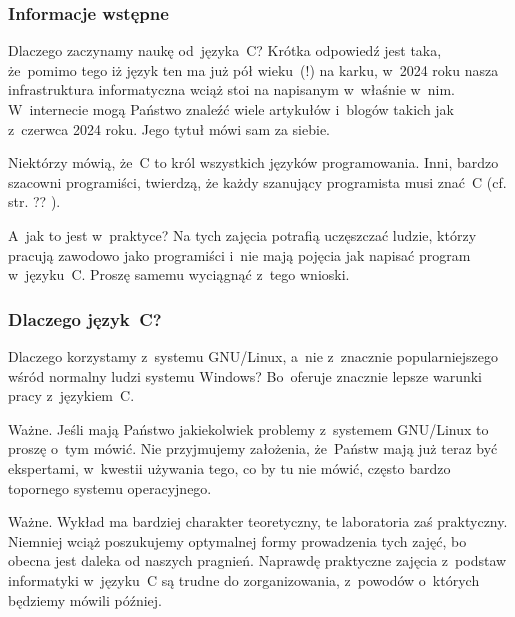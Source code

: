 \documentclass[10pt,t]{beamer}
\begin{document}
\begin{frame}
  \frametitle{Informacje wstępne}


  Dlaczego zaczynamy naukę od~języka~C? Krótka odpowiedź jest taka,
  że~pomimo tego iż język ten ma już pół wieku~(!) na karku, w~2024 roku
  nasza infrastruktura informatyczna wciąż stoi na napisanym w~właśnie
  w~nim. W~internecie mogą Państwo znaleźć wiele artykułów i~blogów takich
  jak
   \parencite{Scott-C-programming-is-still-ETC-Ver-2024}
  z~czerwca 2024 roku. Jego tytuł mówi sam za siebie.

  Niektórzy mówią, że~C to król wszystkich języków programowania.
  Inni, bardzo szacowni programiści, twierdzą, że każdy szanujący
  programista musi znać~C (cf. str. ?? \parencite{Assembler}).

  A~jak to jest w~praktyce? Na tych zajęcia potrafią uczęszczać ludzie,
  którzy pracują zawodowo jako programiści i~nie mają pojęcia jak napisać
  program w~języku~C. Proszę samemu wyciągnąć z~tego wnioski.

\end{frame}





\begin{frame}
  \frametitle{Dlaczego język~C?}


  Dlaczego korzystamy z~systemu GNU/Linux, a~nie z~znacznie
  popularniejszego wśród normalny ludzi systemu Windows? Bo~oferuje
  znacznie lepsze warunki pracy z~językiem~C.

  \alert{Ważne.} Jeśli mają Państwo jakiekolwiek problemy z~systemem
  GNU/Linux to proszę o~tym \alert{mówić}. Nie przyjmujemy założenia,
  że~Państw mają już teraz być ekspertami, w~kwestii używania tego, co by
  tu nie mówić, często bardzo topornego systemu operacyjnego.

  \alert{Ważne.} Wykład ma bardziej charakter teoretyczny, te laboratoria
  zaś praktyczny. Niemniej wciąż poszukujemy optymalnej formy prowadzenia
  tych zajęć, bo obecna jest daleka od naszych pragnień. Naprawdę
  praktyczne zajęcia z~podstaw informatyki w~języku~C są trudne do
  zorganizowania, z~powodów o~których będziemy mówili później.

\end{frame}
\end{document}
